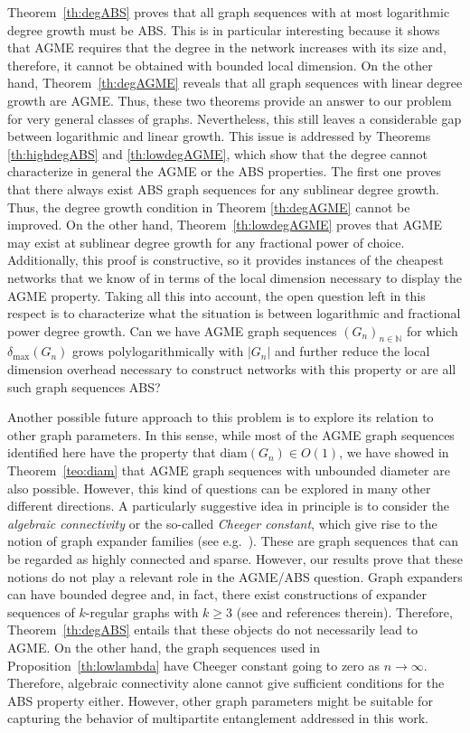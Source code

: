 \documentclass[a4paper,onecolumn,accepted=2024-12-14]{quantumarticle}
\theoremstyle{plain}
\newcommand{\N}{\mathbb{N}} %
\begin{document}
Theorem~\ref{th:degABS} proves that all graph sequences with at most logarithmic degree growth must be ABS. This is in particular interesting because it shows that AGME requires that the degree in the network increases with its size and, therefore, it cannot be obtained with bounded local dimension. On the other hand, Theorem~\ref{th:degAGME} reveals that all graph sequences with linear degree growth are AGME. Thus, these two theorems provide an answer to our problem for very general classes of graphs. Nevertheless, this still leaves a considerable gap between logarithmic and linear growth. This issue is addressed by Theorems \ref{th:highdegABS} and \ref{th:lowdegAGME}, which show that the degree cannot characterize in general the AGME or the ABS properties. The first one proves that there always exist ABS graph sequences for any sublinear degree growth. Thus, the degree growth condition in Theorem \ref{th:degAGME} cannot be improved. On the other hand, Theorem~\ref{th:lowdegAGME} proves that AGME may exist at sublinear degree growth for any fractional power of choice. Additionally, this proof is constructive, so it provides instances of the cheapest networks that we know of in terms of the local dimension necessary to display the AGME property. Taking all this into account, the open question left in this respect is to characterize what the situation is between logarithmic and fractional power degree growth. Can we have AGME graph sequences $(G_n)_{n\in\N}$ for which $\delta_{\max}(G_n)$ grows polylogarithmically with $|G_n|$ and further reduce the local dimension overhead necessary to construct networks with this property or are all such graph sequences ABS?

Another possible future approach to this problem is to explore its relation to other graph parameters. In this sense, while most of the AGME graph sequences identified here have the property that $\textrm{diam}(G_n)\in O(1)$, we have showed in Theorem~\ref{teo:diam} that AGME graph sequences with unbounded diameter are also possible. However, this kind of questions can be explored in many other different directions. A particularly suggestive idea in principle is to consider the \textit{algebraic connectivity} or the so-called \textit{Cheeger constant}, which give rise to the notion of graph expander families (see e.g.\ \cite{chung}). These are graph sequences that can be regarded as highly connected and sparse. However, our results prove that these notions do not play a relevant role in the AGME/ABS question. Graph expanders can have bounded degree and, in fact, there exist
constructions of expander sequences of $k$-regular graphs with $k\geq 3$ (see \cite{marcus15} and references therein). Therefore, Theorem~\ref{th:degABS} entails that these objects do not necessarily lead to AGME. On the other hand, the graph sequences used in Proposition~\ref{th:lowlambda} have Cheeger constant going to zero as $n\to\infty$. Therefore, algebraic connectivity alone cannot give sufficient conditions for the ABS property either. However, other graph parameters might be suitable for capturing the behavior of multipartite entanglement addressed in this work.
\end{document}
